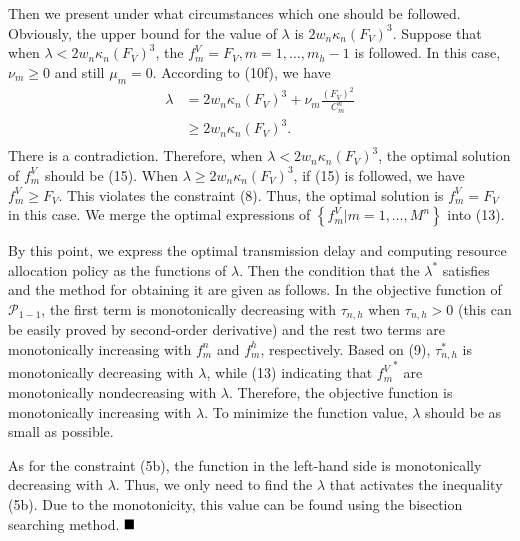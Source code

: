 \documentclass[lettersize,journal]{IEEEtran}
\begin{document}
Then we present under what circumstances which one should be followed. Obviously, the upper bound for the value of $\lambda$ is $2w_n\kappa_n\left(F_V\right)^3$. Suppose that when $\lambda < 2w_n\kappa_n\left(F_V\right)^3$, the $f^{V}_{m}=F_V, m=1,\ldots,m_h-1$ is followed. In this case, $\nu_m\geq0$ and still $\mu_m=0$. According to (10f), we have
\begin{align*}
\lambda &= 2w_n\kappa_n \left(F_V\right)^3 + \nu_m \frac{\left(F_V\right)^2}{C_m^n}\\
&\geq 2w_n\kappa_n \left(F_V\right)^3. \tag{18}\\
\end{align*}
There is a contradiction. Therefore, when $\lambda < 2w_n\kappa_n\left(F_V\right)^3$, the optimal solution of $f^V_{m}$ should be (15). When $\lambda \geq 2w_n\kappa_n\left(F_V\right)^3$, if (15) is followed, we have $f^V_{m} \geq F_V$. This violates the constraint (8). Thus, the optimal solution is $f^{V}_{m}=F_V$ in this case. We merge the optimal expressions of $\left\{f^{V}_{m}|m=1,\ldots,M^n \right\}$ into (13).

By this point, we express the optimal transmission delay and computing resource allocation policy as the functions of $\lambda$. Then the condition that the $\lambda^*$ satisfies and the method for obtaining it are given as follows. In the objective function of $\mathcal{P}_{1-1}$, the first term is monotonically decreasing with $\tau_{n,h}$ when $\tau_{n,h}>0$ (this can be easily proved by second-order derivative) and the rest two terms are monotonically increasing with $f^n_m$ and $f^h_m$, respectively. Based on (9), $\tau_{n,h}^*$ is monotonically decreasing with $\lambda$, while (13) indicating that ${f^V_{m}}^*$ are monotonically nondecreasing with $\lambda$. Therefore, the objective function is monotonically increasing with $\lambda$. To minimize the function value, $\lambda$ should be as small as possible.

As for the constraint (5b), the function in the left-hand side is monotonically decreasing with $\lambda$. Thus, we only need to find the $\lambda$ that activates the inequality (5b). Due to the monotonicity, this value can be found using the bisection searching method. $\hfill\blacksquare$
\end{document}

